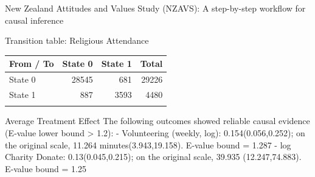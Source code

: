\documentclass[
  ignorenonframetext,
  aspectratio=169,
]{beamer}
\begin{document}
\begin{frame}[fragile]{New Zealand Attitudes and Values Study (NZAVS): A
step-by-step workflow for causal inference}
\begin{block}{Transition table: Religious Attendance}
\label{transition-table-religious-attendance}
\begin{longtable}[]{@{}lrrr@{}}
\toprule\noalign{}
From / To & State 0 & State 1 & Total \\
\midrule\noalign{}
\endhead
State 0 & 28545 & 681 & 29226 \\
State 1 & 887 & 3593 & 4480 \\
\bottomrule\noalign{}
\end{longtable}
\end{block}

\begin{block}{Average Treatment Effect}
\label{average-treatment-effect}
The following outcomes showed reliable causal evidence (E‑value lower
bound \textgreater{} 1.2): - Volunteering (weekly, log):
0.154(0.056,0.252); on the original scale, 11.264 minutes(3.943,19.158).
E‑value bound = 1.287 - log Charity Donate: 0.13(0.045,0.215); on the
original scale, 39.935 (12.247,74.883). E‑value bound = 1.25
\end{block}
\end{frame}
\end{document}
